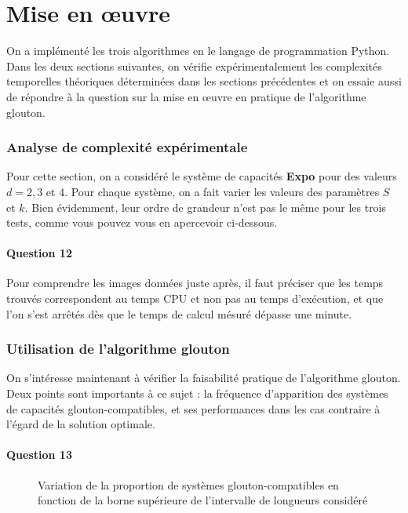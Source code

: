 \documentclass[12pt,a4paper]{article}
\begin{document}
 \newpage
 \part{Mise en \oe uvre}
 On a impl\'ement\'e les trois algorithmes en le langage de programmation Python. Dans les deux sections suivantes, on v\'erifie exp\'erimentalement les complexit\'es temporelles th\'eoriques d\'etermin\'ees dans les sections pr\'ec\'edentes et on essaie aussi de r\'epondre \`a la question sur la mise en \oe uvre en pratique de l'algorithme glouton.

 \section{Analyse de complexit\'e exp\'erimentale}
 Pour cette section, on a consid\'er\'e le syst\`eme de capacit\'es {\bfseries Expo} pour des valeurs $d = 2, 3$ et $4$. Pour chaque syst\`eme, on a fait varier les valeurs des param\`etres $S$ et $k$. Bien \'evidemment, leur ordre de grandeur n'est pas le m\^eme pour les trois tests, comme vous pouvez vous en apercevoir ci-dessous.

 \subsection*{Question 12}
 Pour comprendre les images donn\'ees juste apr\`es, il faut pr\'eciser que les temps trouv\'es correspondent au temps CPU et non pas au temps d'ex\'ecution, et que l'on s'est arr\^et\'es d\`es que le temps de calcul m\'esur\'e d\'epasse une minute.

 \section{Utilisation de l'algorithme glouton}
 On s'int\'eresse maintenant \`a v\'erifier la faisabilit\'e pratique de l'algorithme glouton. Deux points sont importants \`a ce sujet : la fr\'equence d'apparition des syst\`emes de capacit\'es glouton-compatibles, et ses performances dans les cas contraire \`a l'\'egard de la solution optimale.

 \subsection*{Question 13}

\begin{figure}[!h]
  \centering
  \captionsetup{justification=centering}
  \caption[L'impact de la longueur du syst\`eme]{Variation de la proportion de syst\`emes glouton-compatibles en fonction de la borne sup\'erieure de l'intervalle de longueurs consid\'er\'e}
  \label{fig:prop}
\end{figure}
\end{document}
